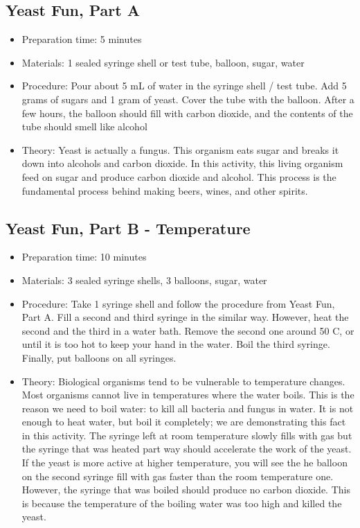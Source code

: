 \subsection{Yeast Fun, Part A}
\begin{itemize}
\item{Preparation time: 5 minutes}
\item{Materials: 1 sealed syringe shell or test tube, balloon, sugar, water}
\item{Procedure: Pour about 5 mL of water in the syringe shell / test tube. Add 5 grams of sugars and 1 gram of yeast. Cover the tube with the balloon. After a few hours, the balloon should fill with carbon dioxide, and the contents of the tube should smell like alcohol}
\item{Theory: Yeast is actually a fungus. This organism eats sugar and breaks it down into alcohols and carbon dioxide. In this activity, this living organism feed on sugar and produce carbon dioxide and alcohol. This process is the fundamental process behind making beers, wines, and other spirits.}
\end{itemize}


\subsection{Yeast Fun, Part B - Temperature}
\begin{itemize}
\item{Preparation time: 10 minutes}
\item{Materials: 3 sealed syringe shells, 3 balloons, sugar, water}
\item{Procedure: Take 1 syringe shell and follow the procedure from Yeast Fun, Part A. Fill a second and third syringe in the similar way. However, heat the second and the third in a water bath. Remove the second one around 50 C, or until it is too hot to keep your hand in the water. Boil the third syringe. Finally, put balloons on all syringes.}
\item{Theory: Biological organisms tend to be vulnerable to temperature changes. Most organisms cannot live in temperatures where the water boils. This is the reason we need to boil water: to kill all bacteria and fungus in water. It is not enough to heat water, but boil it completely; we are demonstrating this fact in this activity. The syringe left at room temperature slowly fills with gas but the syringe that was heated part way should accelerate the work of the yeast. If the yeast is more active at higher temperature, you will see the he balloon on the second syringe fill with gas faster than the room temperature one. However, the syringe that was boiled should produce no carbon dioxide. This is because the temperature of the boiling water was too high and killed the yeast.}
\end{itemize}


